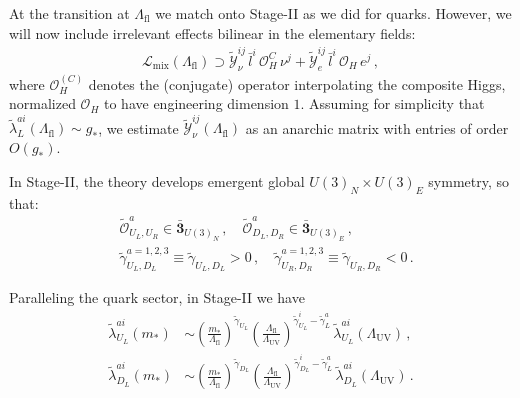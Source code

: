 \documentclass[aps,prl,twocolumn,showpacs,10pt,preprintnumbers,nofootinbib]{revtex4-2}
\newcommand{\gst}{g_*}
\newcommand{\mst}{m_*}
\newcommand{\Lfl}{\Lambda_{\text{fl}}}
\newcommand{\LUV}{\Lambda_{\text{UV}}}
\newcommand{\LL}{\tilde{\lambda}}
\newcommand{\tg}{\tilde{\gamma}}
\newcommand{\op}{\mathcal{O}}
\begin{document}
{At the transition at $\Lfl$ we match onto Stage-II as we did for quarks. However, we will now include irrelevant effects bilinear in the elementary fields:
\begin{align}\label{Eq:BilinearsNeut}
    \mathcal{L}_{\text{mix}}(\Lfl) \supset \tilde{\mathcal{Y}}^{ij}_{\nu}\, \bar{l}^i\, \op_H^C\, \nu^j+\tilde{\mathcal{Y}}^{ij}_{e}\, \bar{l}^i\, \op_H\, e^j\,,
\end{align}
where $\op_H^{(C)}$ denotes the (conjugate) operator interpolating the composite Higgs, normalized $\op_H$ to have engineering dimension $1$. Assuming for simplicity that $\LL_{L}^{ai}(\Lfl) \sim \gst$, we estimate $\tilde{\mathcal{Y}}^{ij}_{\nu}(\Lfl)$ as an anarchic matrix with entries of order $O(\gst)$.

In Stage-II, the theory develops emergent global $U(3)_{N}\times U(3)_E$ symmetry, so that:
\begin{equation}
\begin{aligned}
    &\tilde{\op}^a_{U_L, U_R} \in \bar{\mathbf{3}}_{U(3)_N}\,, \quad
    \tilde{\op}^a_{D_L, D_R} \in \bar{\mathbf{3}}_{U(3)_E}\,, \\
    &\tg_{U_L, D_L}^{a=1,2,3} \equiv \tg_{U_L, D_L} > 0\,, \quad
    \tg_{U_R, D_R}^{a=1,2,3} \equiv \tg_{U_R, D_R} < 0\,.
\end{aligned}
\end{equation}

Paralleling the quark sector, in Stage-II we have
\begin{align}\label{Eq:LinearTermsLeptons}
    \tilde{\lambda}_{U_L}^{ai}(\mst) &\sim \left(\frac{\mst}{\Lfl} \right)^{\tg_{U_L}} 
     \left( \frac{\Lfl}{\LUV}\right)^{\tg_{U_L}^i - \tg_L^a} 
      \,\LL^{ai}_{U_L}(\LUV)\,,\\
      \tilde{\lambda}_{D_L}^{ai}(\mst) &\sim \left(\frac{\mst}{\Lfl} \right)^{\tg_{D_L}} 
     \left( \frac{\Lfl}{\LUV}\right)^{\tg_{D_L}^i - \tg_L^a} 
      \,\LL^{ai}_{D_L}(\LUV)\,.
\end{align}

}
\end{document}
